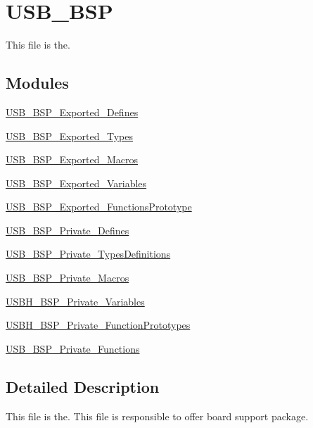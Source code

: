 \hypertarget{group___u_s_b___b_s_p}{\section{U\-S\-B\-\_\-\-B\-S\-P}
\label{group___u_s_b___b_s_p}
}


This file is the.  


\subsection*{Modules}
\begin{DoxyCompactItemize}
\item 
\hyperlink{group___u_s_b___b_s_p___exported___defines}{U\-S\-B\-\_\-\-B\-S\-P\-\_\-\-Exported\-\_\-\-Defines}
\item 
\hyperlink{group___u_s_b___b_s_p___exported___types}{U\-S\-B\-\_\-\-B\-S\-P\-\_\-\-Exported\-\_\-\-Types}
\item 
\hyperlink{group___u_s_b___b_s_p___exported___macros}{U\-S\-B\-\_\-\-B\-S\-P\-\_\-\-Exported\-\_\-\-Macros}
\item 
\hyperlink{group___u_s_b___b_s_p___exported___variables}{U\-S\-B\-\_\-\-B\-S\-P\-\_\-\-Exported\-\_\-\-Variables}
\item 
\hyperlink{group___u_s_b___b_s_p___exported___functions_prototype}{U\-S\-B\-\_\-\-B\-S\-P\-\_\-\-Exported\-\_\-\-Functions\-Prototype}
\item 
\hyperlink{group___u_s_b___b_s_p___private___defines}{U\-S\-B\-\_\-\-B\-S\-P\-\_\-\-Private\-\_\-\-Defines}
\item 
\hyperlink{group___u_s_b___b_s_p___private___types_definitions}{U\-S\-B\-\_\-\-B\-S\-P\-\_\-\-Private\-\_\-\-Types\-Definitions}
\item 
\hyperlink{group___u_s_b___b_s_p___private___macros}{U\-S\-B\-\_\-\-B\-S\-P\-\_\-\-Private\-\_\-\-Macros}
\item 
\hyperlink{group___u_s_b_h___b_s_p___private___variables}{U\-S\-B\-H\-\_\-\-B\-S\-P\-\_\-\-Private\-\_\-\-Variables}
\item 
\hyperlink{group___u_s_b_h___b_s_p___private___function_prototypes}{U\-S\-B\-H\-\_\-\-B\-S\-P\-\_\-\-Private\-\_\-\-Function\-Prototypes}
\item 
\hyperlink{group___u_s_b___b_s_p___private___functions}{U\-S\-B\-\_\-\-B\-S\-P\-\_\-\-Private\-\_\-\-Functions}
\end{DoxyCompactItemize}


\subsection{Detailed Description}
This file is the. This file is responsible to offer board support package.